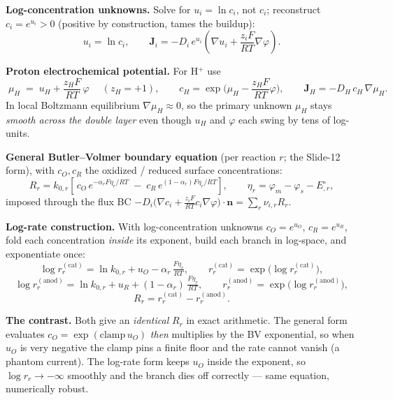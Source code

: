 \documentclass[11pt]{article}
\newcommand{\Eeq}{E^{\circ}}
\newcommand{\Jbf}{\mathbf{J}}
\newcommand{\nbf}{\mathbf{n}}
\begin{document}
\begin{tcolorbox}[cardstyle={Slide 14 --- How we solve it (I): log-$c$ and proton $\mu_H$}]
\textbf{Log-concentration unknowns.} Solve for $u_i=\ln c_i$, not $c_i$;
reconstruct $c_i=e^{u_i}>0$ (positive by construction, tames the buildup):
\[
  u_i = \ln c_i,\qquad
  \Jbf_i = -D_i\,e^{u_i}\!\left(\nabla u_i + \frac{z_i F}{RT}\nabla\varphi\right).
\]

\textbf{Proton electrochemical potential.} For H$^+$ use
\[
  \boxed{\;\mu_H \;=\; u_H + \frac{z_H F}{RT}\,\varphi\;}\quad (z_H=+1),
  \qquad
  c_H = \exp\!\Big(\mu_H - \frac{z_H F}{RT}\varphi\Big),
  \qquad
  \Jbf_H = -D_H\,c_H\,\nabla\mu_H .
\]
In local Boltzmann equilibrium $\nabla\mu_H\approx 0$, so the primary
unknown $\mu_H$ stays \emph{smooth across the double layer} even though
$u_H$ and $\varphi$ each swing by tens of log-units.
\end{tcolorbox}

\begin{tcolorbox}[cardstyle={Slide 14 --- Butler--Volmer: general form vs.\ log-rate construction}]
\textbf{General Butler--Volmer boundary equation} (per reaction $r$; the
Slide-12 form), with $c_O,c_R$ the oxidized / reduced surface
concentrations:
\[
  R_r = k_{0,r}\!\left[\,c_O\,e^{-\alpha_r F\eta_r/RT}
                     \;-\; c_R\,e^{(1-\alpha_r)F\eta_r/RT}\right],
  \qquad \eta_r = \varphi_m - \varphi_s - \Eeq_{,r},
\]
imposed through the flux BC
$-D_i\big(\nabla c_i + \tfrac{z_iF}{RT}c_i\nabla\varphi\big)\!\cdot\nbf
= \sum_r \nu_{i,r} R_r$.

\textbf{Log-rate construction.} With log-concentration unknowns
$c_O = e^{u_O}$, $c_R = e^{u_R}$, fold each concentration \emph{inside}
its exponent, build each branch in log-space, and exponentiate once:
\[
  \log r_r^{(\mathrm{cat})} = \ln k_{0,r} + u_O - \alpha_r\,\tfrac{F\eta_r}{RT},
  \qquad r_r^{(\mathrm{cat})} = \exp\!\big(\log r_r^{(\mathrm{cat})}\big),
\]
\[
  \log r_r^{(\mathrm{anod})} = \ln k_{0,r} + u_R + (1-\alpha_r)\,\tfrac{F\eta_r}{RT},
  \qquad r_r^{(\mathrm{anod})} = \exp\!\big(\log r_r^{(\mathrm{anod})}\big),
\]
\[
  R_r = r_r^{(\mathrm{cat})} - r_r^{(\mathrm{anod})}.
\]

\textbf{The contrast.} Both give an \emph{identical} $R_r$ in exact
arithmetic. The general form evaluates $c_O = \exp(\mathrm{clamp}\,u_O)$
\emph{then} multiplies by the BV exponential, so when $u_O$ is very
negative the clamp pins a finite floor and the rate cannot vanish (a
phantom current). The log-rate form keeps $u_O$ inside the exponent, so
$\log r_r\to-\infty$ smoothly and the branch dies off correctly --- same
equation, numerically robust.
\end{tcolorbox}
\end{document}
